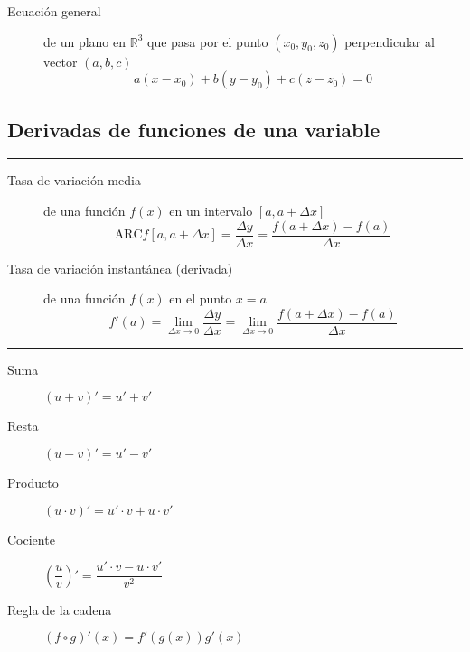 \begin{multicols}{2}
\begin{tcolorbox}[hbox, title=Planos]
\begin{minipage}{0.4\textwidth}
\begin{description}
\item[Ecuación general] de un plano en $\mathbb{R}^3$ que pasa por el punto $(x_0,y_0,z_0)$ perpendicular al vector $(a,b,c)$
      \[
      a(x-x_0)+b(y-y_0)+c(z-z_0)=0
      \]
\end{description}
\end{minipage}
\end{tcolorbox}


\subsection*{Derivadas de funciones de una variable}

\begin{tcolorbox}[hbox, title=Concepto de derivada]
\begin{minipage}{0.4\textwidth}
\flushleft
\rule{0.4\textwidth}{0pt}
\begin{description}
\item[Tasa de variación media] de una función $f(x)$ en un intervalo $[a,a+\Delta x]$
      \[
      \mbox{ARC}f[a,a+\Delta x] = \frac{\Delta y}{\Delta x} = \frac{f(a+\Delta x)-f(a)}{\Delta x}
      \]
\item[Tasa de variación instantánea (derivada)] de una función $f(x)$ en el punto $x=a$
      \[
      f'(a)=\lim_{\Delta x\rightarrow 0} \frac{\Delta y}{\Delta x} = \lim_{\Delta x\rightarrow 0}\frac{f(a+\Delta x)-f(a)}{\Delta x}
      \]
\end{description}
\end{minipage}
\end{tcolorbox}

\begin{tcolorbox}[hbox, title=Álgebra de derivadas]
\begin{minipage}{0.4\textwidth}
\flushleft
\rule{0.4\textwidth}{0pt}
\begin{description}
\item[Suma] $(u+v)'=u'+v'$
\item[Resta] $(u-v)'=u'-v'$
\item[Producto] $(u\cdot v)'=u'\cdot v+ u\cdot v'$
\item[Cociente] $\left(\dfrac{u}{v}\right)'=\dfrac{u'\cdot v-u\cdot v'}{v^2}$
\item[Regla de la cadena] $(f\circ g)'(x)=f'(g(x))g'(x)$
\end{description}
\end{minipage}
\end{tcolorbox}


\end{multicols}
